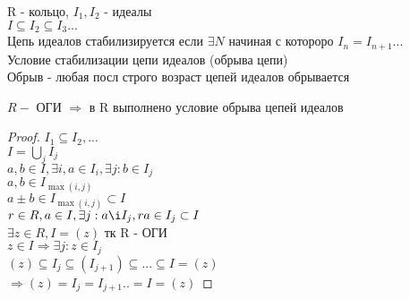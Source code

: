 R - кольцо, $ I_1, I_2 $ - идеалы \\
$ I \subseteq I_2 \subseteq I_3 ... $ \\
Цепь идеалов стабилизируется если $ \exists N $ начиная с котороро $ I_n = I_{n+1} ... $ \\
Условие стабилизации цепи идеалов (обрыва цепи) \\
Обрыв - любая посл строго возраст цепей идеалов обрывается \\
\begin{theorem}
	$ R - $ ОГИ $ \Rightarrow $ в R выполнено условие обрыва цепей идеалов \\
	\begin{proof}
		$ I_1 \subseteq I_2, ... $ \\
		$ I = \bigcup_j I_j $ \\
		$ a, b \in I, \exists i, a \in I_i,  \exists j : b \in I_j$ \\
		$ a,b \in I_{\max(i,j)} $ \\
		$ a \pm b \in  I_{\max(i,j)} \subset I $ \\
		$ r \in R, a\in I, \exists j : a \i I_j, ra \in I_j \subset I $\\
		$ \exists z \in R, I = (z) $ тк R - ОГИ \\
		$ z \in I \Rightarrow \exists j : z \in I_j $ \\
		$ (z) \subseteq I_j \subseteq (I_{j+1}) \subseteq ... \subseteq I = (z) $ \\
		$ \Rightarrow (z) = I_j = I_{j+1} .. = I = (z) $		
	\end{proof}
\end{theorem}

